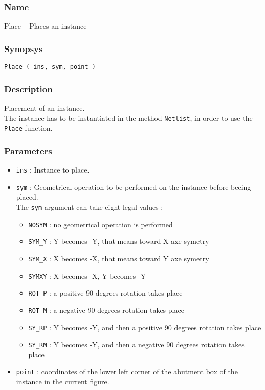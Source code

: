\subsubsection{Name}

Place -- Places an instance

\subsubsection{Synopsys}

\begin{verbatim}
Place ( ins, sym, point )
\end{verbatim}

\subsubsection{Description}

Placement of an instance.\\
\indent The instance has to be instantiated in the method \verb-Netlist-, in order to use the \verb-Place- function.
    
\subsubsection{Parameters}

\begin{itemize}
    \item \verb-ins- : Instance to place.
    \item \verb-sym- : Geometrical operation to be performed on the instance before beeing placed.\\The \verb-sym- argument can take eight legal values :
    \begin{itemize}
        \item \verb-NOSYM- : no geometrical operation is performed
        \item \verb-SYM_Y- : Y becomes -Y, that means toward X axe symetry
        \item \verb-SYM_X- : X becomes -X, that means toward Y axe symetry
        \item \verb-SYMXY- : X becomes -X, Y becomes -Y
        \item \verb-ROT_P- : a positive 90 degrees rotation takes place
        \item \verb-ROT_M- : a negative 90 degrees rotation takes place
        \item \verb-SY_RP- : Y becomes -Y, and then a positive 90 degrees rotation takes place
        \item \verb-SY_RM- : Y becomes -Y, and then a negative 90 degrees rotation takes place
    \end{itemize}
    \item \verb-point- : coordinates of the lower left corner of the abutment box of the instance in the current figure.
\end{itemize}
    
